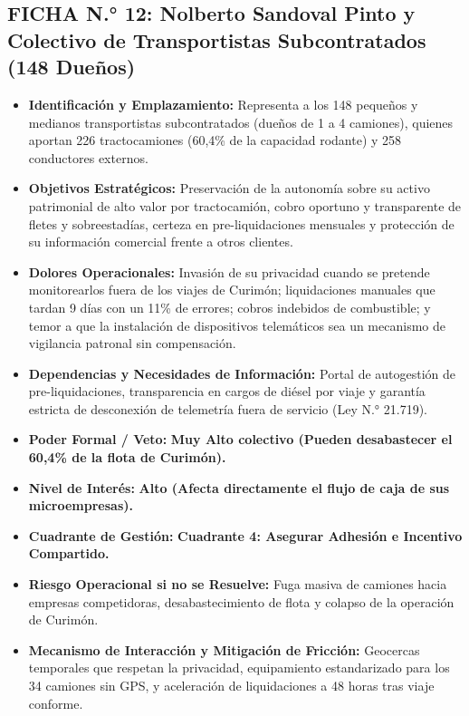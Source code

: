 \subsection*{FICHA N.° 12: Nolberto Sandoval Pinto y Colectivo de Transportistas Subcontratados (148 Dueños)}
\begin{itemize}
\item \textbf{Identificación y Emplazamiento:} Representa a los 148 pequeños y medianos transportistas subcontratados (dueños de 1 a 4 camiones), quienes aportan 226 tractocamiones (60,4\% de la capacidad rodante) y 258 conductores externos.
\item \textbf{Objetivos Estratégicos:} Preservación de la autonomía sobre su activo patrimonial de alto valor por tractocamión, cobro oportuno y transparente de fletes y sobreestadías, certeza en pre-liquidaciones mensuales y protección de su información comercial frente a otros clientes.
\item \textbf{Dolores Operacionales:} Invasión de su privacidad cuando se pretende monitorearlos fuera de los viajes de Curimón; liquidaciones manuales que tardan 9 días con un 11\% de errores; cobros indebidos de combustible; y temor a que la instalación de dispositivos telemáticos sea un mecanismo de vigilancia patronal sin compensación.
\item \textbf{Dependencias y Necesidades de Información:} Portal de autogestión de pre-liquidaciones, transparencia en cargos de diésel por viaje y garantía estricta de desconexión de telemetría fuera de servicio (Ley N.° 21.719).
\item \textbf{Poder Formal / Veto:} \textbf{Muy Alto colectivo (Pueden desabastecer el 60,4\% de la flota de Curimón).}
\item \textbf{Nivel de Interés:} \textbf{Alto (Afecta directamente el flujo de caja de sus microempresas).}
\item \textbf{Cuadrante de Gestión:} \textbf{Cuadrante 4: Asegurar Adhesión e Incentivo Compartido.}
\item \textbf{Riesgo Operacional si no se Resuelve:} Fuga masiva de camiones hacia empresas competidoras, desabastecimiento de flota y colapso de la operación de Curimón.
\item \textbf{Mecanismo de Interacción y Mitigación de Fricción:} Geocercas temporales que respetan la privacidad, equipamiento estandarizado para los 34 camiones sin GPS, y aceleración de liquidaciones a 48 horas tras viaje conforme.
\end{itemize}
